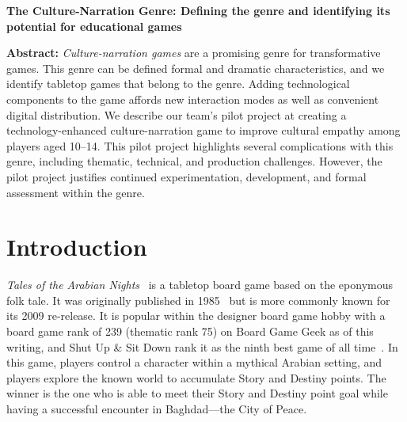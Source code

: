 \documentclass[a4paper]{article}
\newcommand{\projecttitle}{The Culture-Narration Genre: Defining the genre and identifying its potential for educational games}
\begin{document}
\begin{center}
\fontsize{14}{16.8}\selectfont
\bf \projecttitle
\end{center}

\vspace{-0.25in}
\begin{center}
\iftoggle{blind}{
}{
Paul Gestwicki, others, Ball State University\\
pvgestwicki@bsu.edu\\
}
\end{center}

\newcommand{\totan}{\textit{TotAN}}
\newcommand{\smersh}{\textit{SMERSH}}

%
\begin{adjustwidth}{0.5in}{0.5in}
  \textbf{Abstract:} \textit{Culture-narration games} are a promising
  genre for transformative games. This genre can be defined formal and
  dramatic characteristics, and we identify tabletop games that belong
  to the genre.  Adding technological components to the game affords
  new interaction modes as well as convenient digital distribution. We
  describe our team's pilot project at creating a technology-enhanced
  culture-narration game to improve cultural empathy among players aged
  10--14.  This pilot project highlights several complications with
  this genre, including thematic, technical, and production
  challenges.  However, the pilot project justifies continued
  experimentation, development, and formal assessment within the
  genre.
\end{adjustwidth}

\section{Introduction}

\textit{Tales of the Arabian Nights}~\citep{Goldberg2009} is a 
tabletop board game based on the eponymous folk tale.
It was originally published in 1985~\citep{Goldberg1985} but is more commonly
known for its 2009 re-release. 
It is popular within the designer board game hobby with a board game
rank of 239 (thematic rank 75) on Board Game Geek as of this writing,
and Shut Up \& Sit Down rank it as the ninth best game of all 
time~\citep{ShutUp2015}.
In this game, players control a character within a mythical Arabian
setting, and players explore the known world to accumulate Story and
Destiny points. The winner is the one who is able to meet their 
Story and Destiny point goal while having a successful encounter
in Baghdad---the City of Peace.
\end{document}
